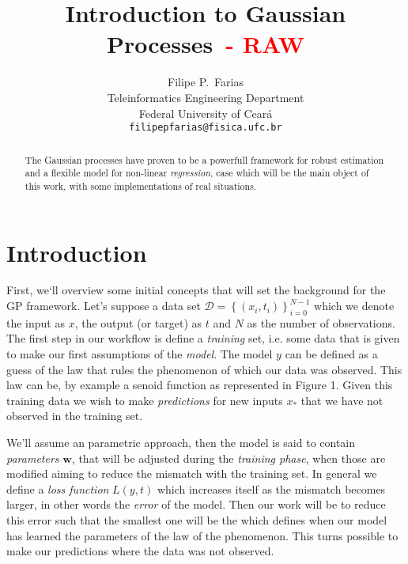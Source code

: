 \documentclass[11pt]{article} %
\title{Introduction to Gaussian Processes\ifIntroGPfinal \else \ \textcolor{red}{- RAW} \fi}
\author{
Filipe P.~Farias \\
Teleinformatics Engineering Department\\
Federal University of Ceará\\
\texttt{filipepfarias@fisica.ufc.br} \\
}
\begin{document}
\maketitle

\begin{abstract}
   The Gaussian processes have proven to be a powerfull framework for robust estimation and a flexible model for non-linear \textit{regression}, case which will be the main object of this work, with some implementations of real situations.%
\end{abstract}
\ifIntroGPfinal
\section{Introduction}
\nocite{hennig2013gaussian}

First, we`ll overview some initial concepts that will set the background for the GP framework. Let's suppose a data set $\mathcal{D} = \left\{ \left( x_i,t_i \right) \right\}_{i=0}^{N-1}$ which we denote the input as $x$, the output (or target) as $t$ and $N$ as the number of observations. The first step in our workflow is define a \textit{training} set, i.e. some data that is given to make our first assumptions of the \textit{model}. The model $y$ can be defined as a guess of the law that rules the phenomenon of which our data was observed. This law can be, by example a senoid function as represented in Figure 1. Given this training data we wish to make \textit{predictions} for new inputs $x_*$ that we have not observed in the training set.


We'll assume an parametric approach, then the model is said to contain \textit{parameters} $\mathbf{w}$, that will be adjusted during the \textit{training phase}, when those are modified aiming to reduce the mismatch with the training set. In general we define a \textit{loss function} $L\left( y,t \right)$ which increases itself as the mismatch becomes larger, in other words the \textit{error} of the model. Then our work will be to reduce this error such that the smallest one will be the which defines when our model has learned the parameters of the law of the phenomenon. This turns possible to make our predictions where the data was not observed.

\end{document}
